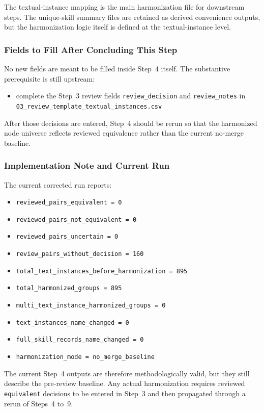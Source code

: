 The textual-instance mapping is the main harmonization file for downstream steps. The unique-skill summary files are retained as derived convenience outputs, but the harmonization logic itself is defined at the textual-instance level.

\subsubsection{Fields to Fill After Concluding This Step}
\label{sec:step4_fields_to_fill}

No new fields are meant to be filled inside Step~4 itself. The substantive prerequisite is still upstream:
\begin{itemize}
    \item complete the Step~3 review fields \texttt{review\_decision} and \texttt{review\_notes} in
    \texttt{03\_review\_template\_textual\_instances.csv}
\end{itemize}

After those decisions are entered, Step~4 should be rerun so that the harmonized node universe reflects reviewed equivalence rather than the current no-merge baseline.

\subsubsection{Implementation Note and Current Run}
\label{sec:step4_implementation_note}

The current corrected run reports:
\begin{itemize}
    \item \texttt{reviewed\_pairs\_equivalent = 0}
    \item \texttt{reviewed\_pairs\_not\_equivalent = 0}
    \item \texttt{reviewed\_pairs\_uncertain = 0}
    \item \texttt{review\_pairs\_without\_decision = 160}
    \item \texttt{total\_text\_instances\_before\_harmonization = 895}
    \item \texttt{total\_harmonized\_groups = 895}
    \item \texttt{multi\_text\_instance\_harmonized\_groups = 0}
    \item \texttt{text\_instances\_name\_changed = 0}
    \item \texttt{full\_skill\_records\_name\_changed = 0}
    \item \texttt{harmonization\_mode = no\_merge\_baseline}
\end{itemize}

The current Step~4 outputs are therefore methodologically valid, but they still describe the pre-review baseline. Any actual harmonization requires reviewed \texttt{equivalent} decisions to be entered in Step~3 and then propagated through a rerun of Steps~4 to~9.
